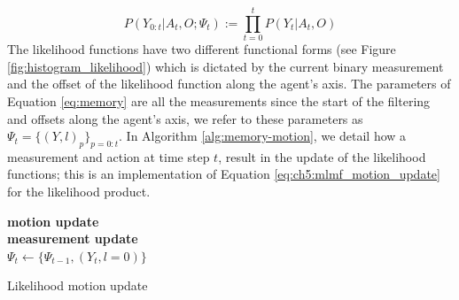 \begin{equation}
 P(Y_{0:t}|A_t,O;\Psi_t) := \prod_{t=0}^t P(Y_t|A_t,O) \label{eq:memory}
\end{equation}
The likelihood functions have two different functional forms (see Figure \ref{fig:histogram_likelihood}) which is dictated 
by the current binary measurement and the offset of the likelihood function along the agent's axis. The parameters of Equation \ref{eq:memory}
are all the measurements since the start of the filtering and offsets along the agent's axis, we refer to these parameters
as $\Psi_t = \{(Y,l)_p\}_{p=0:t}$. In Algorithm \ref{alg:memory-motion}, we detail how a measurement and action at 
time step $t$, result in the update of the likelihood functions; this is an implementation of Equation  \ref{eq:ch5:mlmf_motion_update}
for the likelihood product.

\begin{center}
\begin{minipage}{.65\linewidth}

\begin{algorithm}[H]
\label{alg:memory-motion}

\BlankLine
\textbf{motion update}\label{alg:ch5:motion_memory}\\
\textbf{measurement update}\\
$\Psi_t \gets \{\Psi_{t-1}, (Y_t,l=0)\}$ 

\caption{Likelihood motion update}

\end{algorithm} 
\end{minipage}
\end{center}



